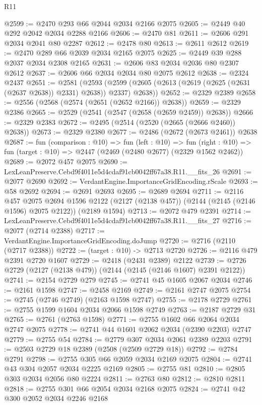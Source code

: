 \begin{lexlean}{R11}
\begin{coremodule}
@2599 := @2470 @293 @66 @2044 @2034 @2166 @2075
@2605 := @2449 @40 @292 @2042 @2034 @2288 @2166
@2606 := @2470 @81
@2611 := @2606 @291 @2034 @2041 @80 @2287
@2612 := @2478 @80
@2613 := @2611 @2612
@2619 := @2470 @289 @66 @2039 @2034 @2165 @2075
@2625 := @2449 @39 @288 @2037 @2034 @2308 @2165
@2631 := @2606 @83 @2034 @2036 @80 @2307 @2612
@2637 := @2606 @66 @2034 @2034 @80 @2075 @2612
@2638 := @2324 @2437
@2651 := @2581
    (@2593 (@2599 (@2605 (@2613 (@2619 (@2625 (@2631 (@2637 @2638)) @2331) @2638)) @2337) @2638))
@2652 := @2329 @2389
@2658 := @2556 (@2568 (@2574 (@2651 (@2652 @2166)) @2638))
@2659 := @2329 @2386
@2665 := @2529 (@2541 (@2547 (@2658 (@2659 @2459)) @2638))
@2666 := @2329 @2383
@2672 := @2495 (@2514 (@2520 (@2665 (@2666 @2460)) @2638))
@2673 := @2329 @2380
@2677 := @2486 (@2672 (@2673 @2461)) @2638
@2687 := fun (comparison : @10) =>
  fun (left : @10) =>
  fun (right : @10) => fun (target : @10) => @2447 (@2469 (@2480 @2677) (@2329 @1562 @2462))
@2689 := @2072 @457 @2075
@2690 := LexLeanPreserve.Cebd9f4011e5d4cdaf91cb0042ff67a38.R11.__fits_26
@2691 := @2077 @2690
@2692 := VerdantEngine.ImportanceGridEncoding.rScale
@2693 := @58 @2692
@2694 := @2691 @2693
@2695 := @2689 @2694
@2711 := @2116
    @457
    @2075
    @2694
    @1596
    @2122
    (@2127 (@2138 @457))
    (@2144 (@2145 (@2146 @1596) @2075 @2122))
    (@2189 @1594)
@2713 := @2072 @479 @2391
@2714 := LexLeanPreserve.Cebd9f4011e5d4cdaf91cb0042ff67a38.R11.__fits_27
@2716 := @2077 (@2714 @2388)
@2717 := VerdantEngine.ImportanceGridEncoding.doJump
@2720 := @2716 (@2110 (@2717 @2388))
@2722 := (target : @10) -> @2713 @2720
@2726 := @2116 @479 @2391 @2720 @1607
@2729 := @2418 (@2431 @2389) @2122
@2739 := @2726 @2729 (@2127 (@2138 @479)) (@2144 (@2145 (@2146 @1607) @2391 @2122))
@2741 := @2154 @2729 @279
@2745 := @2741 @45 @1605 @2067 @2034
@2746 := @2161 @1598
@2747 := @2458 @2169
@2749 := @2161 @2747 @2075
@2754 := @2745 (@2746 @2749) (@2163 @1598 @2747)
@2755 := @2178 @2729
@2761 := @2755 @1599 @1604 @2034 @2066 @1598 @2749
@2763 := @2187 @2729 @31
@2765 := @2761 (@2763 @1598)
@2771 := @2755 @1602 @66 @2064 @2034 @2747 @2075
@2778 := @2741 @44 @1601 @2062 @2034 (@2390 @2203) @2747
@2779 := @2755 @54
@2784 := @2779 @307 @2034 @2061 @2389 @2203
@2791 := @2503 @2729 @18 @2389 (@2508 (@2509 @2729 @18))
@2792 := @2784 @2791
@2798 := @2755 @305 @66 @2059 @2034 @2169 @2075
@2804 := @2741 @43 @304 @2057 @2034 @2225 @2169
@2805 := @2755 @81
@2810 := @2805 @303 @2034 @2056 @80 @2224
@2811 := @2763 @80
@2812 := @2810 @2811
@2818 := @2755 @301 @66 @2054 @2034 @2168 @2075
@2824 := @2741 @42 @300 @2052 @2034 @2246 @2168

\end{coremodule}
\end{lexlean}
